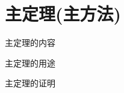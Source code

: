 \chapter{主定理(主方法)}
\begin{introduction}
	\item 主定理的内容
	\item 主定理的用途
	\item 主定理的证明
\end{introduction}

